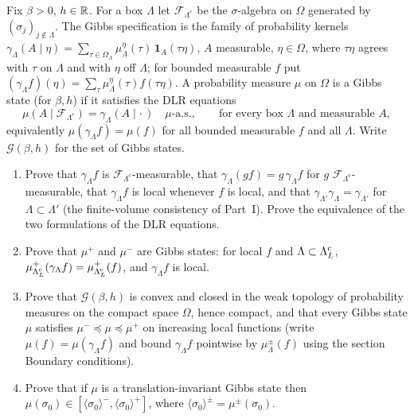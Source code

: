 \begin{exercise}
Fix $\beta>0$, $h\in\mathbb R$.  For a box $\Lambda$ let $\mathcal F_{\Lambda^c}$ be
the $\sigma$-algebra on $\Omega$ generated by $(\sigma_j)_{j\notin\Lambda}$.
The Gibbs specification is the family of probability kernels
$\gamma_\Lambda(A\mid\eta)=\sum_{\tau\in\Omega_\Lambda}\mu^\eta_\Lambda(\tau)\,
\mathbf 1_A(\tau\eta)$, $A$ measurable, $\eta\in\Omega$, where
$\tau\eta$ agrees with $\tau$ on $\Lambda$ and with $\eta$ off $\Lambda$;
for bounded measurable $f$ put
$(\gamma_\Lambda f)(\eta)=\sum_\tau\mu^\eta_\Lambda(\tau)f(\tau\eta)$.  A
probability measure $\mu$ on $\Omega$ is a Gibbs state (for $\beta,h$) if it
satisfies the DLR equations
\[
 \mu(A\mid\mathcal F_{\Lambda^c})=\gamma_\Lambda(A\mid\cdot\,)\quad\mu\text{-a.s.},
 \qquad\text{for every box }\Lambda\text{ and measurable }A ,
\]
equivalently $\mu(\gamma_\Lambda f)=\mu(f)$ for all bounded measurable $f$ and
all $\Lambda$.  Write $\mathcal G(\beta,h)$ for the set of Gibbs states.
\begin{enumerate}[label=(\alph*)]
\item Prove that $\gamma_\Lambda f$ is $\mathcal F_{\Lambda^c}$-measurable,
that $\gamma_\Lambda(gf)=g\,\gamma_\Lambda f$ for $g$
$\mathcal F_{\Lambda^c}$-measurable, that $\gamma_\Lambda f$ is local
whenever $f$ is local, and that $\gamma_{\Lambda'}\gamma_\Lambda=\gamma_{\Lambda'}$
for $\Lambda\subset\Lambda'$ (the finite-volume consistency of Part~I).
Prove the equivalence of the two formulations of the DLR equations.
\item Prove that $\mu^+$ and $\mu^-$ are Gibbs states: for local $f$ and
$\Lambda\subset\Lambda_L^{\rm c}$, $\mu^+_{\Lambda_L^{\rm c}}(\gamma_\Lambda f)=\mu^+_{\Lambda_L^{\rm c}}(f)$,
and $\gamma_\Lambda f$ is local.
\item Prove that $\mathcal G(\beta,h)$ is convex and closed in the weak
topology of probability measures on the compact space $\Omega$, hence
compact, and that every Gibbs state $\mu$ satisfies
$\mu^-\preceq\mu\preceq\mu^+$ on increasing local functions
(write $\mu(f)=\mu(\gamma_\Lambda f)$ and bound $\gamma_\Lambda f$ pointwise
by $\mu^\pm_\Lambda(f)$ using the section Boundary conditions).
\item Prove that if $\mu$ is a translation-invariant Gibbs state then
$\mu(\sigma_0)\in[\langle\sigma_0\rangle^-,\langle\sigma_0\rangle^+]$, where
$\langle\sigma_0\rangle^\pm=\mu^\pm(\sigma_0)$.
\end{enumerate}
\end{exercise}

